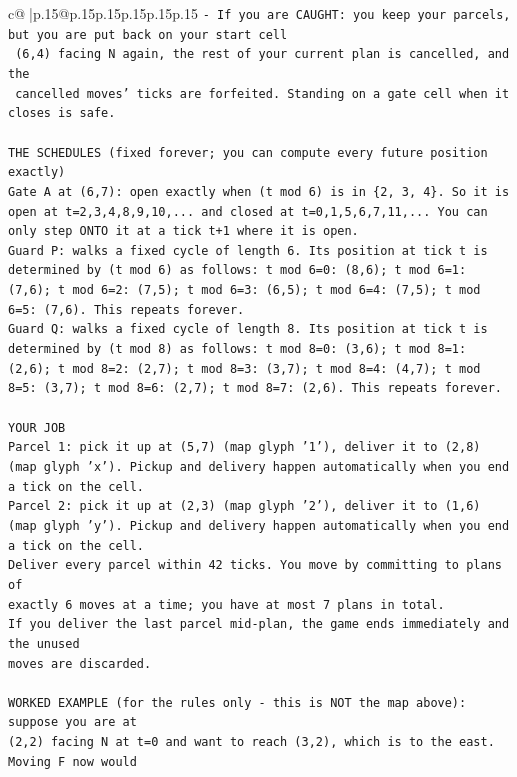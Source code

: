 \documentclass{article}
\begin{document}
{\begin{supertabular}{c@{$\;$}|p{.15\linewidth}@{}p{.15\linewidth}p{.15\linewidth}p{.15\linewidth}p{.15\linewidth}p{.15\linewidth}}
{{{\texttt{{-} If you are CAUGHT: you keep your parcels, but you are put back on your start cell} \\
\texttt{  (6,4) facing N again, the rest of your current plan is cancelled, and the} \\
\texttt{  cancelled moves' ticks are forfeited. Standing on a gate cell when it closes is safe.} \\
\\ 
\texttt{THE SCHEDULES (fixed forever; you can compute every future position exactly)} \\
\texttt{Gate A at (6,7): open exactly when (t mod 6) is in \{2, 3, 4\}. So it is open at t=2,3,4,8,9,10,... and closed at t=0,1,5,6,7,11,... You can only step ONTO it at a tick t+1 where it is open.} \\
\texttt{Guard P: walks a fixed cycle of length 6. Its position at tick t is determined by (t mod 6) as follows: t mod 6=0: (8,6); t mod 6=1: (7,6); t mod 6=2: (7,5); t mod 6=3: (6,5); t mod 6=4: (7,5); t mod 6=5: (7,6). This repeats forever.} \\
\texttt{Guard Q: walks a fixed cycle of length 8. Its position at tick t is determined by (t mod 8) as follows: t mod 8=0: (3,6); t mod 8=1: (2,6); t mod 8=2: (2,7); t mod 8=3: (3,7); t mod 8=4: (4,7); t mod 8=5: (3,7); t mod 8=6: (2,7); t mod 8=7: (2,6). This repeats forever.} \\
\\ 
\texttt{YOUR JOB} \\
\texttt{Parcel 1: pick it up at (5,7) (map glyph '1'), deliver it to (2,8) (map glyph 'x'). Pickup and delivery happen automatically when you end a tick on the cell.} \\
\texttt{Parcel 2: pick it up at (2,3) (map glyph '2'), deliver it to (1,6) (map glyph 'y'). Pickup and delivery happen automatically when you end a tick on the cell.} \\
\texttt{Deliver every parcel within 42 ticks. You move by committing to plans of} \\
\texttt{exactly 6 moves at a time; you have at most 7 plans in total.} \\
\texttt{If you deliver the last parcel mid{-}plan, the game ends immediately and the unused} \\
\texttt{moves are discarded.} \\
\\ 
\texttt{WORKED EXAMPLE (for the rules only {-} this is NOT the map above): suppose you are at} \\
\texttt{(2,2) facing N at t=0 and want to reach (3,2), which is to the east. Moving F now would} \\
}}}
\end{supertabular}}
\end{document}
